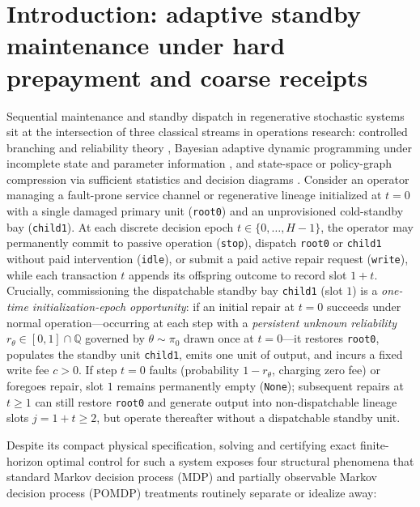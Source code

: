 \documentclass[11pt,a4paper]{article}
\begin{document}
\section{Introduction: adaptive standby maintenance under hard
prepayment and coarse
receipts}\label{introduction-adaptive-standby-maintenance-under-hard-prepayment-and-coarse-receipts}

Sequential maintenance and standby dispatch in regenerative stochastic
systems sit at the intersection of three classical streams in operations
research: controlled branching and reliability theory
\citep{harris1963, sevastyanov1971, athreyaNey1972, barlowProschan1975, pliska1976, rothblumWhittle1982},
Bayesian adaptive dynamic programming under incomplete state and
parameter information
\citep{bellman1957, bellman1961, astrom1965, rieder1975, bertsekasShreve1978, easleyKiefer1988},
and state-space or policy-graph compression via sufficient statistics
and decision diagrams
\citep{striebel1965, dynkin1978, bryant1986, boutilier2000, bergman2016}.
Consider an operator managing a fault-prone service channel or
regenerative lineage initialized at \(t = 0\) with a single damaged
primary unit (\texttt{root0}) and an unprovisioned cold-standby bay
(\texttt{child1}). At each discrete decision epoch
\(t \in \{0, \dots, H-1\}\), the operator may permanently commit to
passive operation (\texttt{stop}), dispatch \texttt{root0} or
\texttt{child1} without paid intervention (\texttt{idle}), or submit a
paid active repair request (\texttt{write}), while each transaction
\(t\) appends its offspring outcome to record slot \(1 + t\). Crucially,
commissioning the dispatchable standby bay \texttt{child1} (slot \(1\))
is a \emph{one-time initialization-epoch opportunity}: if an initial
repair at \(t = 0\) succeeds under normal operation---occurring at each
step with a \emph{persistent unknown reliability}
\(r_\theta \in [0,1] \cap \mathbb{Q}\) governed by \(\theta \sim \pi_0\)
drawn once at \(t = 0\)---it restores \texttt{root0}, populates the
standby unit \texttt{child1}, emits one unit of output, and incurs a
fixed write fee \(c > 0\). If step \(t = 0\) faults (probability
\(1 - r_\theta\), charging zero fee) or foregoes repair, slot \(1\)
remains permanently empty (\texttt{None}); subsequent repairs at
\(t \ge 1\) can still restore \texttt{root0} and generate output into
non-dispatchable lineage slots \(j = 1 + t \ge 2\), but operate
thereafter without a dispatchable standby unit.

Despite its compact physical specification, solving and certifying exact
finite-horizon optimal control for such a system exposes four structural
phenomena that standard Markov decision process (MDP) and partially
observable Markov decision process (POMDP) treatments routinely separate
or idealize away:
\end{document}
